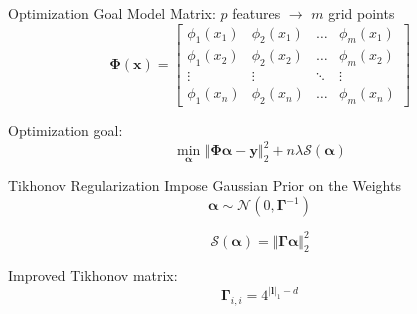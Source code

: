 \documentclass{beamer}
\begin{document}
  \begin{frame}{Optimization Goal}
Model Matrix: \(p\) features \(\rightarrow\) \(m\) grid points
\begin{equation}
\bm{\Phi}(\bm{x}) = \begin{bmatrix}
\phi_1(x_1) & \phi_2(x_1) & \hdots & \phi_m(x_1) \\
\phi_1(x_2) & \phi_2(x_2) & \hdots & \phi_m(x_2) \\
\vdots & \vdots & \ddots & \vdots \\
\phi_1(x_n) & \phi_2(x_n) & \hdots & \phi_m(x_n)
\end{bmatrix}
\end{equation}

Optimization goal:
\begin{equation}\label{eq:optGoal}
\min_{\bm{\alpha}} \left\Vert  \bm{\Phi} \bm{\alpha} - \bm{y}   \right\Vert_2^2  + n \lambda \mathcal{S}(\bm{\alpha}) 
\end{equation}
  \end{frame}
  \begin{frame}{Tikhonov Regularization}
 Impose Gaussian Prior on the Weights
\begin{equation}\label{eq:diagonal-prior}
\bm{\alpha} \sim \mathcal{N} (0, \bm{\Gamma}^{-1})
\end{equation}

 \begin{equation}\label{eq:tik-langrangian}
  \mathcal{S}(\bm{\alpha}) = \Vert \bm{\Gamma} \bm{\alpha} \Vert_2^2
  \end{equation}

Improved Tikhonov matrix:
\begin{equation}\label{eq:diagonal-matrix}
\bm{\Gamma}_{i,i} = 4^{\vert \bm{l} \vert_1 - d}
\end{equation}
  \end{frame}
\end{document}
